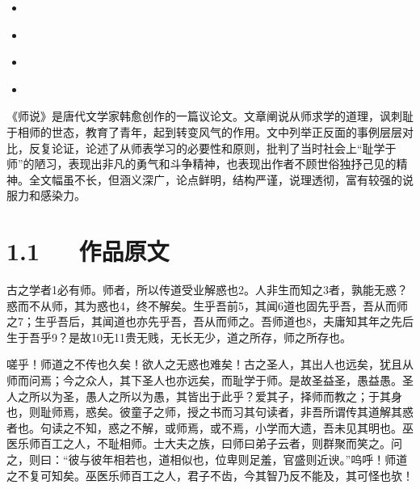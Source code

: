 \documentclass[letterpaper,10pt,english]{sphinxmanual}
\begin{document}
\begin{sphinxShadowBox}
\begin{itemize}
\begin{itemize}
\begin{itemize}
\item {} 
\label{\detokenize{p01_u6563_u6587/_u97e9_u6108-_u5e08_u8bf4:id22}}{\hyperref[\detokenize{p01_u6563_u6587/_u97e9_u6108-_u5e08_u8bf4:id10}]{}}

\item {} 
\label{\detokenize{p01_u6563_u6587/_u97e9_u6108-_u5e08_u8bf4:id23}}{\hyperref[\detokenize{p01_u6563_u6587/_u97e9_u6108-_u5e08_u8bf4:id11}]{}}

\item {} 
\label{\detokenize{p01_u6563_u6587/_u97e9_u6108-_u5e08_u8bf4:id24}}{\hyperref[\detokenize{p01_u6563_u6587/_u97e9_u6108-_u5e08_u8bf4:id12}]{}}

\item {} 
\label{\detokenize{p01_u6563_u6587/_u97e9_u6108-_u5e08_u8bf4:id25}}{\hyperref[\detokenize{p01_u6563_u6587/_u97e9_u6108-_u5e08_u8bf4:id13}]{}}

\end{itemize}

\end{itemize}

\end{itemize}
\end{sphinxShadowBox}

《师说》是唐代文学家韩愈创作的一篇议论文。文章阐说从师求学的道理，讽刺耻于相师的世态，教育了青年，起到转变风气的作用。文中列举正反面的事例层层对比，反复论证，论述了从师表学习的必要性和原则，批判了当时社会上“耻学于师”的陋习，表现出非凡的勇气和斗争精神，也表现出作者不顾世俗独抒己见的精神。全文幅虽不长，但涵义深广，论点鲜明，结构严谨，说理透彻，富有较强的说服力和感染力。


\section{1.1   作品原文}
\label{\detokenize{p01_u6563_u6587/_u97e9_u6108-_u5e08_u8bf4:id3}}
古之学者1必有师。师者，所以传道受业解惑也2。人非生而知之3者，孰能无惑？惑而不从师，其为惑也4，终不解矣。生乎吾前5，其闻6道也固先乎吾，吾从而师之7；生乎吾后，其闻道也亦先乎吾，吾从而师之。吾师道也8，夫庸知其年之先后生于吾乎9？是故10无11贵无贱，无长无少，道之所存，师之所存也。

嗟乎！师道之不传也久矣！欲人之无惑也难矣！古之圣人，其出人也远矣，犹且从师而问焉；今之众人，其下圣人也亦远矣，而耻学于师。是故圣益圣，愚益愚。圣人之所以为圣，愚人之所以为愚，其皆出于此乎？爱其子，择师而教之；于其身也，则耻师焉，惑矣。彼童子之师，授之书而习其句读者，非吾所谓传其道解其惑者也。句读之不知，惑之不解，或师焉，或不焉，小学而大遗，吾未见其明也。巫医乐师百工之人，不耻相师。士大夫之族，曰师曰弟子云者，则群聚而笑之。问之，则曰：“彼与彼年相若也，道相似也，位卑则足羞，官盛则近谀。”呜呼！师道之不复可知矣。巫医乐师百工之人，君子不齿，今其智乃反不能及，其可怪也欤！
\end{document}
